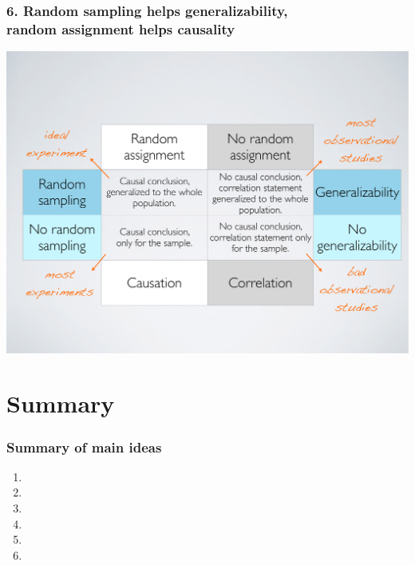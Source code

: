 \documentclass[11pt]{beamer}
\begin{document}
\begin{frame}
\frametitle{6. Random sampling helps generalizability,\\ random assignment helps 
causality}

\begin{center}
\includegraphics[width=\textwidth]{figures/random_sample_assignment}
\end{center}

\end{frame}


\section{Summary}


\begin{frame}
\frametitle{Summary of main ideas}

\vfill

\begin{enumerate}

\item {}

\item {}

\item {}

\item {}

\item {}

\item {}

\end{enumerate}

\vfill

\end{frame}
\end{document}

